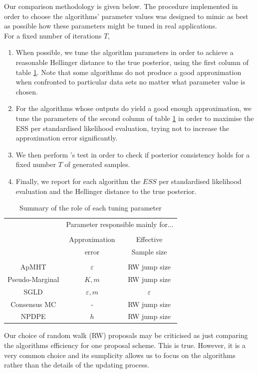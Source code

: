 \documentclass[11pt,a4paper]{report}\usepackage[]{graphicx}\usepackage[]{color}
\begin{document}
\noindent Our comparison methodology is given below. The procedure implemented in order to choose the algorithms' parameter values was designed to mimic as best as possible how these parameters might be tuned in real applications.\\
For a fixed number of iterations $T$,
\begin{enumerate}
    \item When possible, we tune the algorithm parameters in order to achieve a reasonable Hellinger distance to the true posterior, using the first column of table \ref{tab4}. Note that some algorithms do not produce a good approximation when confronted to particular data sets no matter what parameter value is chosen.
    \item For the algorithms whose outputs do yield a good enough approximation, we tune the parameters of the second column of table \ref{tab4} in order to maximise the ESS per standardised likelihood evaluation, trying not to increase the approximation error significantly.
    \item We then perform \cite{geweke2004getting}'s test in order to check if posterior consistency holds for a fixed number $T$ of generated samples.
    \item Finally, we report for each algorithm the $ESS$ per standardised likelihood evaluation and the Hellinger distance to the true posterior.
\end{enumerate}

\begin{table}[H]

    \centering
    \begin{tabular}{ccc}
    &\multicolumn{2}{c}{Parameter responsible mainly for...}\\
    &&\\
    &Approximation& Effective \\
    & error&Sample size\\
        &&\\
    ApMHT   & $\varepsilon$ & RW jump size\\

    \hline
    Pseudo-Marginal    &$K,m$ & RW jump size\\ 
    \hline
    SGLD     &$\varepsilon,m$&$\varepsilon$\\
    \hline
    Consensus MC  & - & RW jump size\\ 
    \hline
    NPDPE    &$h$ &RW jump size\\ 
    \hline

    \end{tabular}
    \caption{Summary of the role of each tuning parameter}
    \label{tab4}

\end{table}
Our choice of random walk (RW) proposals may be criticised as just comparing the algorithms efficiency for one proposal scheme. This is true. However, it is a very common choice and its sumplicity allows us to focus on the algorithms rather than the details of the updating process.
\newpage
\end{document}
